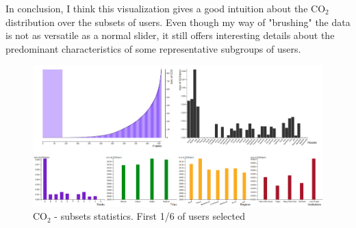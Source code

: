\documentclass{article}
\begin{document}
In conclusion, I think this visualization gives a good intuition about the CO$_2$ distribution over the subsets of users. Even though my way of "brushing" the data is not as versatile as a normal slider, it still offers interesting details about the predominant characteristics of some representative subgroups of users.
 

\begin{figure}[H]
	\centering
	\includegraphics[scale=0.28]{img/ceo2_first.png}
	\caption{CO${_2}$ - subsets statistics. First 1/6 of users selected}
	\label{fig:ceo2_first}
\end{figure}




\newpage



\end{document}

